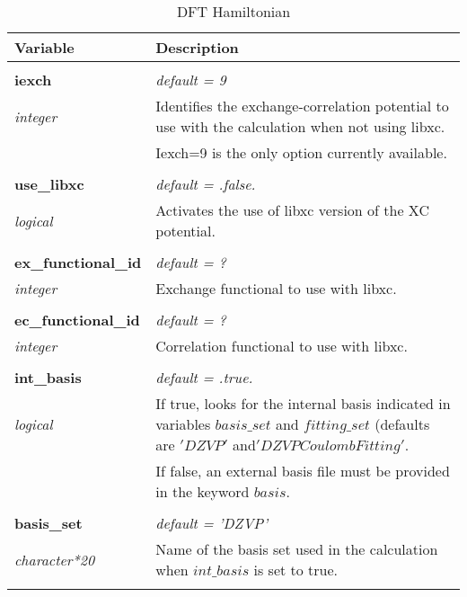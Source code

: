 \begin{Spacing}{1.0}
\begin{longtable}{ p{} p{} }

   \toprule
   \textbf{Variable} & Description \\*
   \midrule \\*
   \endhead

   \bottomrule
   \caption{DFT Hamiltonian}
   \endfoot

   \textbf{iexch}
   &  \textit{default = 9}
   \\*\textit{integer}
   & Identifies the exchange-correlation potential to use
   with the calculation when not using libxc.\\*
   & Iexch=9 is the only option currently available.\\* \\

   \textbf{use\_libxc}
   &  \textit{default = .false. }
   \\*\textit{logical}
   & Activates the use of libxc version of the XC
   potential.\\* \\

   \textbf{ex\_functional\_id}
   &  \textit{default = ?}
   \\*\textit{integer}
   & Exchange functional to use with libxc.\\* \\

   \textbf{ec\_functional\_id}
   &  \textit{default = ?}
   \\*\textit{integer}
   & Correlation functional to use with libxc.\\* \\

   \textbf{int\_basis}
   &  \textit{default = .true. }
   \\*\textit{logical}
   & If true, looks for the internal basis indicated in
   variables $basis\_set$ and $fitting\_set$ (defaults
   are $'DZVP'$ and$'DZVP Coulomb Fitting'$.\\*
   & If false, an external basis file must be provided in
   the keyword $basis$.\\* \\

   \textbf{basis\_set}
   &  \textit{default = 'DZVP'}
   \\*\textit{character*20}
   & Name of the basis set used in the calculation when
   $int\_basis$ is set to true.\\* \\


\end{longtable}
\end{Spacing}
